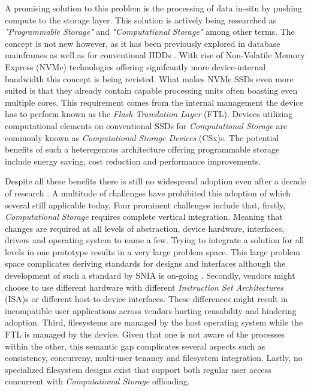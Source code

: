
A promising solution to this problem is the processing of data in-situ by
pushing compute to the storage layer. This solution is actively being researched
as \textit{"Programmable Storage"} and \textit{"Computational Storage"} among
other terms. The concept is not new however, as it has been previously
explored in database mainframes \cite{database-computer} as well as for
conventional HDDs \cite{active-disk-pillar, active-disks-tech,
intelligent-disk}. With rise of Non-Volatile Memory Express (NVMe) technologies
offering signifcantly more device-internal bandwidth this concept is being
revisted. What makes NVMe SSDs even more suited is that they already contain
capable processing units often boasting even multiple cores. This requirement
comes from the internal management the device has to perform known as the
\textit{Flash Translation Layer} (FTL). Devices utilizing computational elements
on conventional SSDs for \textit{Computational Storage} are commonly known as
\textit{Computational Storage Devices} (CSx)s. The potential benefits of such a
heteregenous architecture offering programmable storage include energy saving,
cost reduction and performance improvements.


Despite all these benefits there is still no widespread adoption even after a
decade of research \cite{lukken2021past}. A multitude of challenges
have prohibited this adoption of which several still applicable today. Four
prominent challenges include that, firstly, \textit{Computational Storage}
requires complete vertical integration. Meaning that changes are required at all
levels of abstraction, device hardware, interfaces, drivers and operating system
to name a few. Trying to integrate a solution for all levels in one prototype
results in a very large problem space. This large problem space complicates
deriving standards for designs and interfaces although the development of such a
standard by SNIA is on-going \cite{snia-model}. Secondly, vendors might choose
to use different hardware with different
\textit{Instruction Set Architectures} (ISA)s or different host-to-device
interfaces. These differences might result in incompatible user applications
across vendors hurting reusability and hindering adoption. Third, filesystems
are managed by the host operating system while the FTL is
managed by the device. Given that one is not aware of the processes within the
other, this semantic gap complicates several aspects such as consistency,
concurreny, multi-user tenancy and filesystem integration. Lastly, no
specialized filesystem designs exist that support both regular user access
concurrent with \textit{Computational Storage} offloading.

